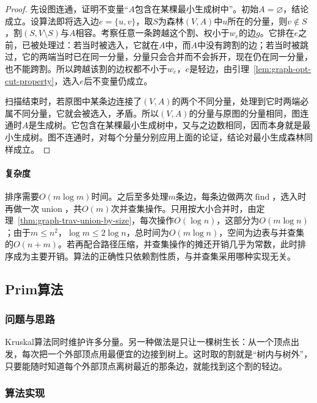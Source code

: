 \begin{proof}
先设图连通，证明不变量“$A$包含在某棵最小生成树中”。初始$A=\varnothing$，结论成立。设算法即将选入边$e=\{u,v\}$，取$S$为森林$(V,A)$中$u$所在的分量，则$v\notin S$，割$(S,V\setminus S)$与$A$相容。考察任意一条跨越这个割、权小于$w_e$的边$g$。它排在$e$之前，已被处理过：若当时被选入，它就在$A$中，而$A$中没有跨割的边；若当时被跳过，它的两端当时已在同一分量，分量只会合并而不会拆开，现在仍在同一分量，也不能跨割。所以跨越该割的边权都不小于$w_e$，$e$是轻边，由引理~\ref{lem:graph-opt-cut-property}，选入$e$后不变量仍成立。

扫描结束时，若原图中某条边连接了$(V,A)$的两个不同分量，处理到它时两端必属不同分量，它就会被选入，矛盾。所以$(V,A)$的分量与原图的分量相同，图连通时$A$是生成树。它包含在某棵最小生成树中，又与之边数相同，因而本身就是最小生成树。图不连通时，对每个分量分别应用上面的论证，结论对最小生成森林同样成立。
\end{proof}

\paragraph{复杂度}
排序需要$O(m\log m)$时间。之后至多处理$m$条边，每条边做两次$\operatorname{find}$，选入时再做一次$\operatorname{union}$，共$O(m)$次并查集操作。只用按大小合并时，由定理~\ref{thm:graph-trav-union-by-size}，每次操作$O(\log n)$，这部分为$O(m\log n)$；由于$m\leq n^2$，$\log m\leq2\log n$，总时间为$O(m\log n)$，空间为边表与并查集的$O(n+m)$。若再配合路径压缩，并查集操作的摊还开销几乎为常数，此时排序成为主要开销。算法的正确性只依赖割性质，与并查集采用哪种实现无关。

\subsection{Prim算法}
\label{sec:graph-opt-prim}

\subsubsection{问题与思路}

Kruskal算法同时维护许多分量。另一种做法是只让一棵树生长：从一个顶点出发，每次把一个外部顶点用最便宜的边接到树上。这时取的割就是“树内与树外”，只要能随时知道每个外部顶点离树最近的那条边，就能找到这个割的轻边。

\subsubsection{算法实现}

